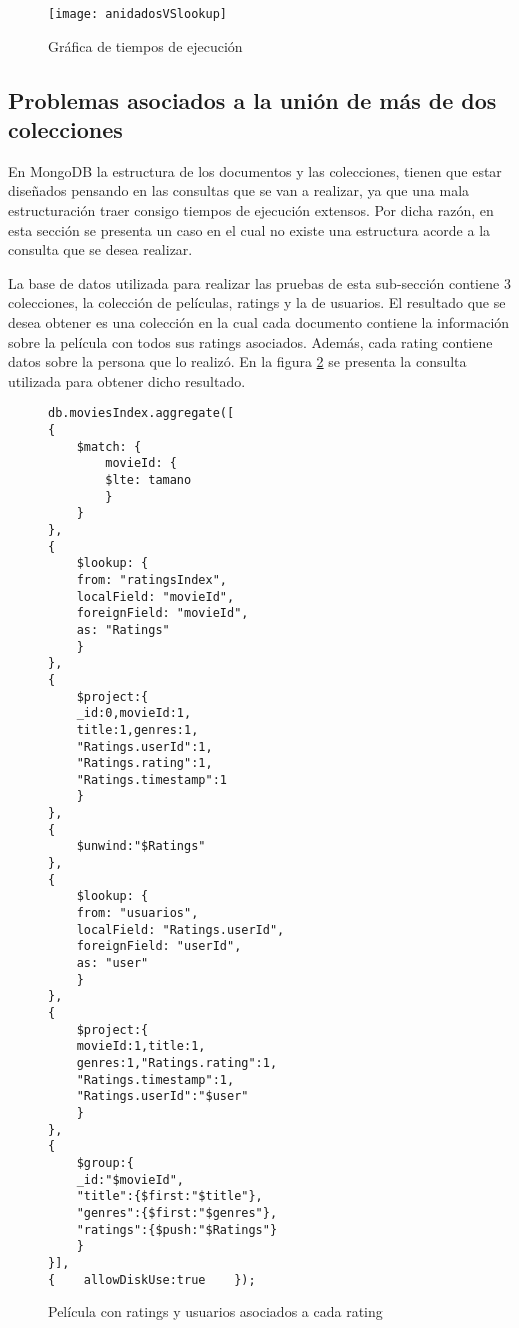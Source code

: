 \documentclass[conference,compsoc]{sty/IEEEtran}
\begin{document}
\begin{figure}
\begin{center}
\texttt{[image: anidadosVSlookup]}
\end{center}
\caption{Gráfica de tiempos de ejecución} 
\label{fig:anidados-lookup}
\end{figure}

\subsection{Problemas asociados a la unión de más de dos colecciones}
 En MongoDB la estructura de los documentos y las colecciones, tienen que estar diseñados pensando en las consultas que se van a realizar, ya que una mala estructuración  traer consigo tiempos de ejecución extensos. Por dicha razón, en esta sección se presenta un caso en el cual no existe una estructura acorde a la consulta que se desea realizar. \par

La base de datos utilizada para realizar las pruebas de esta sub-sección contiene 3 colecciones, la colección de películas, ratings y la de usuarios. El resultado que se desea obtener es una colección en la cual cada documento contiene la información sobre la película con todos sus ratings asociados. Además, cada rating contiene datos sobre la persona que lo realizó. En la figura \ref{fig:consulta-doubleJoin} se presenta la consulta utilizada para obtener dicho resultado. 

\begin{figure}
    \begin{verbatim}
db.moviesIndex.aggregate([
{
    $match: {
        movieId: {
        $lte: tamano
        }
    }
},
{
    $lookup: {
    from: "ratingsIndex",
    localField: "movieId",
    foreignField: "movieId",
    as: "Ratings"
    }
},
{
    $project:{
	_id:0,movieId:1,
	title:1,genres:1,
	"Ratings.userId":1,
	"Ratings.rating":1,
	"Ratings.timestamp":1
    }
},
{
    $unwind:"$Ratings"
},
{
    $lookup: {
    from: "usuarios",
    localField: "Ratings.userId",
    foreignField: "userId",
    as: "user"
    }
},
{
    $project:{
	movieId:1,title:1,
	genres:1,"Ratings.rating":1,
	"Ratings.timestamp":1,
	"Ratings.userId":"$user"
    }
},
{
    $group:{
	_id:"$movieId",
	"title":{$first:"$title"},
	"genres":{$first:"$genres"},
	"ratings":{$push:"$Ratings"}
	}
}],
{    allowDiskUse:true    });    
\end{verbatim}
\caption{Película con ratings y usuarios asociados a cada rating} 
\label{fig:consulta-doubleJoin}
\end{figure}
\end{document}
